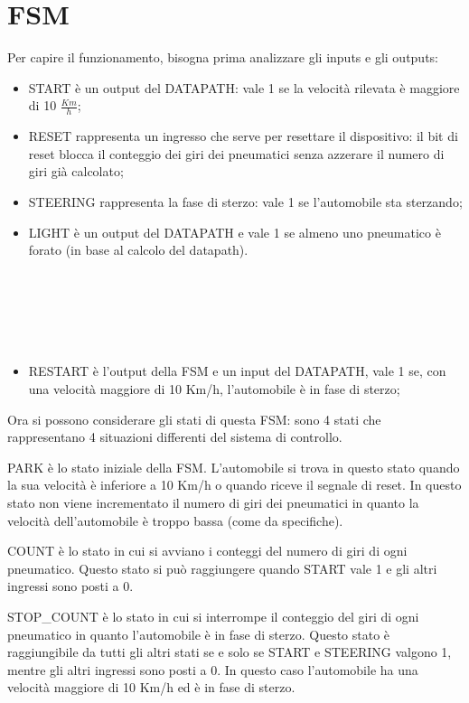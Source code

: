 \documentclass[a4paper,titlepage]{book}
\begin{document}
\chapter{FSM}

Per capire il funzionamento, bisogna prima analizzare gli inputs e gli outputs:
\begin{itemize}

\item START è un output del DATAPATH: vale 1 se la velocità rilevata è maggiore di 10 $\frac{Km}{h}$;
\item RESET rappresenta un ingresso che serve per resettare il dispositivo: il bit di reset blocca il conteggio dei giri dei pneumatici senza azzerare il numero di giri già calcolato;
\item STEERING rappresenta la fase di sterzo: vale 1 se l’automobile sta sterzando;
\item LIGHT è un output del DATAPATH e vale 1 se almeno uno pneumatico è forato (in base al calcolo del datapath).
~

~

~

~
\item RESTART è l’output della FSM e un input del DATAPATH, vale 1 se, con una velocità maggiore di 10 Km/h, l’automobile è in fase di sterzo;

\end{itemize}

Ora si possono considerare gli stati di questa FSM: sono 4 stati che rappresentano 4 situazioni differenti del sistema di controllo.

PARK è lo stato iniziale della FSM. L’automobile si trova in questo stato quando la sua velocità è inferiore a 10 Km/h o quando riceve il segnale di reset. In questo stato non viene incrementato il numero di giri dei pneumatici in quanto la velocità dell’automobile è troppo bassa (come da specifiche).
 
COUNT è lo stato in cui si avviano i conteggi del numero di giri di ogni pneumatico. Questo stato si può raggiungere quando START vale 1 e gli altri ingressi sono posti a 0.

STOP\_COUNT è lo stato in cui si interrompe il conteggio del giri di ogni pneumatico in quanto l’automobile è in fase di sterzo. Questo stato è
raggiungibile da tutti gli altri stati se e solo se START e STEERING valgono 1, mentre gli altri ingressi sono posti a 0. In questo caso l’automobile ha una velocità maggiore di 10 Km/h ed è in fase di sterzo.
\end{document}
